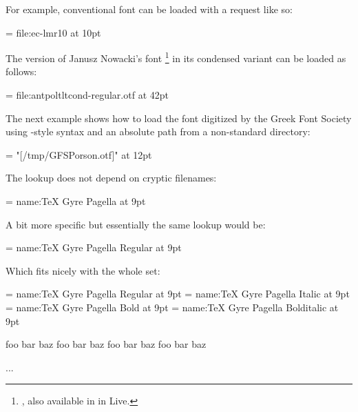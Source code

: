\endsubsection



For example, conventional  font can be loaded with a
 request like so:

\beginlisting
  \font \lmromanten = {file:ec-lmr10} at 10pt
\endlisting

The \OpenType version of Janusz Nowacki’s font \footnote{%
  \hyperlink {http://jmn.pl/antykwa-poltawskiego/}, also available in
  in \TEX Live.
}
in its condensed variant can be loaded as follows:

\beginlisting
  \font \apcregular = file:antpoltltcond-regular.otf at 42pt
\endlisting

The next example shows how to load the  font digitized by
the Greek Font Society using \XETEX-style syntax and an absolute path from a
non-standard directory:

\beginlisting
  \font \gfsporson = "[/tmp/GFSPorson.otf]" at 12pt
\endlisting

\endsubsubsection


The  lookup does not depend on cryptic filenames:

\beginlisting
  \font \pagellaregular = {name:TeX Gyre Pagella} at 9pt
\endlisting

A bit more specific but essentially the same lookup would be:

\beginlisting
  \font \pagellaregular = {name:TeX Gyre Pagella Regular} at 9pt
\endlisting

\noindent
Which fits nicely with the whole set:

\beginlisting
  \font\pagellaregular    = {name:TeX Gyre Pagella Regular}    at 9pt
  \font\pagellaitalic     = {name:TeX Gyre Pagella Italic}     at 9pt
  \font\pagellabold       = {name:TeX Gyre Pagella Bold}       at 9pt
  \font\pagellabolditalic = {name:TeX Gyre Pagella Bolditalic} at 9pt

  {\pagellaregular     foo bar baz\endgraf}
  {\pagellaitalic      foo bar baz\endgraf}
  {\pagellabold        foo bar baz\endgraf}
  {\pagellabolditalic  foo bar baz\endgraf}

  ...
\endlisting

\endsubsubsection


